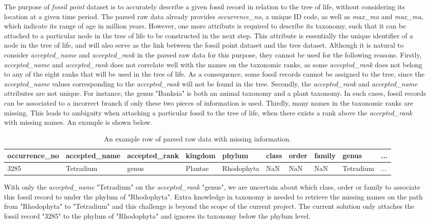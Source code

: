 \documentclass[11pt, a4paper,oneside,chapterprefix=false]{scrbook}
\begin{document}
The purpose of \emph{fossil point} dataset is to accurately describe a given fossil record in relation to the tree of life, without considering its location at a given time period. The parsed raw data already provides \emph{occurrence\_no}, a unique ID code, as well as \emph{max\_ma} and \emph{max\_ma}, which indicate its range of age in million years. However, one more attribute is required to describe its taxonomy, such that it can be attached to a particular node in the tree of life to be constructed in the next step. This attribute is essentially the unique identifier of a node in the tree of life, and will also serve as the link between the fossil point dataset and the tree dataset. Although it is natural to consider \emph{accepted\_name} and \emph{accepted\_rank} in the parsed raw data for this purpose, they cannot be used for the following reasons. Firstly, \emph{accepted\_name} and \emph{accepted\_rank} does not correlate well with the names on the taxonomic ranks, as some \emph{accepted\_rank} does not belong to any of the eight ranks that will be used in the tree of life. As a consequence, some fossil records cannot be assigned to the tree, since the \emph{accepted\_name} values corresponding to the \emph{accepted\_rank} will not be found in the tree. Secondly, the \emph{accepted\_rank} and \emph{accepted\_name} attributes are not unique. For instance, the genus "Banksia" is both an animal taxonomy and a plant taxonomy. In such cases, fossil records can be associated to a incorrect branch if only these two pieces of information is used. Thirdly, many names in the taxonomic ranks are missing. This leads to ambiguity when attaching a particular fossil to the tree of life, when there exists a rank above the \emph{accepted\_rank} with missing names. An example is shown below.

\begin{table}[h]
	\centering
	\begin{tabular}{|l|l|l|l|l|l|l|l|l|l|}
		\hline
		occurrence\_no &  accepted\_name & accepted\_rank & kingdom &	phylum & class & order & family & genus & ... \\ \hline
		3285 &  Tetradium & genus & Plantae & Rhodophyta & NaN & NaN & NaN & Tetradium & ... \\ \hline
	\end{tabular}
	\caption{An example row of parsed raw data with missing information.}
	\label{tab:missing_information}
\end{table}

With only the \emph{accepted\_name} "Tetradium" on the \emph{accepted\_rank} "genus", we are uncertain about which class, order or family to associate this fossil record to under the phylum of "Rhodophyta". Extra knowledge in taxonomy is needed to retrieve the missing names on the path from "Rhodophyta" to "Tetradium" and this challenge is beyond the scope of the current project. The current solution only attaches the fossil record "3285" to the phylum of "Rhodophyta" and ignores its taxonomy below the phylum level. \\
\end{document}
